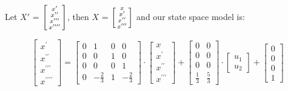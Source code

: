 \documentclass{article}
\begin{document}
     Let $X'$ = $\begin{bsmallmatrix}
            x^{\prime}\\
            x^{\prime\prime} \\
            x^{\prime\prime\prime} \\
            x^{\prime\prime\prime\prime}
        \end{bsmallmatrix}$, then $X$ = $\begin{bsmallmatrix}
                                            x\\
                                            x^{\prime} \\
                                            x^{\prime\prime} \\
                                            x^{\prime\prime\prime} 
                                        \end{bsmallmatrix}$ and our state space model is:
                                        
    \bigskip                         
    
    $$\begin{bmatrix}
            x^\prime\\
            x^{\prime\prime}\\
            x^{\prime\prime\prime}\\
            x^{\prime\prime\prime\prime}
        \end{bmatrix} = 
        \begin{bmatrix}
            0 & 1 & 0 & 0\\
            0 & 0 & 1 & 0 \\
            0 & 0 & 0 & 1 \\
            0 & -\frac{2}{3} & 1 & -\frac{2}{3}
        \end{bmatrix} \cdot
        \begin{bmatrix}
            x\\
            x^{\prime}\\
            x^{\prime\prime}\\
            x^{\prime\prime\prime}
        \end{bmatrix} + 
        \begin{bmatrix}
            0 & 0\\
            0 & 0\\
            0 & 0\\
            \frac{1}{3} & \frac{5}{3}
        \end{bmatrix} \cdot
         \begin{bmatrix}
            u_1\\
            u_2
        \end{bmatrix} + 
        \begin{bmatrix}
            0\\
            0\\
            0\\
            1
        \end{bmatrix}$$ 
        
\end{document}
